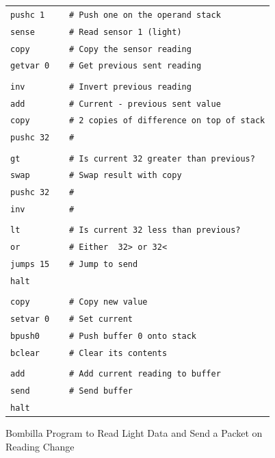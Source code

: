 \documentclass[10pt]{article}
\begin{document}
\begin{figure}
\begin{center}
\scriptsize
\begin{tabular}{l}
\verb;pushc 1     # Push one on the operand stack;\\
\verb;sense       # Read sensor 1 (light);\\
\verb;copy        # Copy the sensor reading;\\
\verb;getvar 0    # Get previous sent reading;\\
\verb;;\\
\verb;inv         # Invert previous reading ;\\
\verb;add         # Current - previous sent value;\\
\verb;copy        # 2 copies of difference on top of stack;\\
\verb;pushc 32    #;\\
\verb;;\\
\verb;gt          # Is current 32 greater than previous?;\\
\verb;swap        # Swap result with copy ;\\
\verb;pushc 32    #;\\
\verb;inv         #;\\
\verb;;\\
\verb;lt          # Is current 32 less than previous?;\\
\verb;or          # Either  32> or 32<;\\
\verb;jumps 15    # Jump to send;\\
\verb;halt;\\
\verb;;\\
\verb;copy        # Copy new value;\\
\verb;setvar 0    # Set current;\\
\verb;bpush0      # Push buffer 0 onto stack;\\
\verb;bclear      # Clear its contents;\\
\verb;;\\
\verb;add         # Add current reading to buffer;\\
\verb;send        # Send buffer;\\
\verb;halt;\\

\end{tabular}
\normalsize
\caption{Bombilla Program to Read Light Data and Send a Packet on Reading Change}
\label{fig:sense}
\end{center}
\end{figure}
\end{document}

